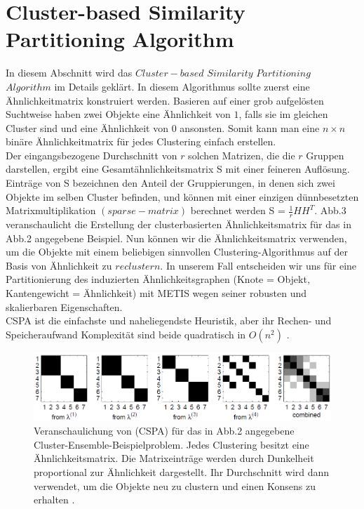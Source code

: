 \documentclass[runningheads]{llncs}
\begin{document}
\section{Cluster-based Similarity Partitioning Algorithm}
In diesem Abschnitt wird das $Cluster-based$ $Similarity$ $Partitioning$ $Algorithm$ im Details geklärt. In diesem Algorithmus sollte zuerst eine Ähnlichkeitmatrix konstruiert werden. Basieren auf einer grob aufgelösten Suchtweise haben zwei Objekte eine Ähnlichkeit von $1$, falls sie im gleichen Cluster sind und eine Ähnlichkeit von $0$ ansonsten. Somit kann man eine $n \times n$ binäre Ähnlichkeitmatrix für jedes Clustering einfach erstellen. \\
Der eingangsbezogene Durchschnitt von $r$ solchen Matrizen, die die $r$ Gruppen darstellen, ergibt eine Gesamtähnlichkeitsmatrix S mit einer feineren Auflösung. Einträge von S bezeichnen den Anteil der Gruppierungen, in denen sich zwei Objekte im selben Cluster befinden,
und können mit einer einzigen dünnbesetzten Matrixmultiplikation $(sparse- matrix)$ berechnet werden S = $\frac{1}{r} H H^{T}$. Abb.3 veranschaulicht die Erstellung der clusterbasierten Ähnlichkeitsmatrix für das in Abb.2 angegebene Beispiel. Nun können wir die Ähnlichkeitsmatrix verwenden, um die Objekte mit einem beliebigen sinnvollen
Clustering-Algorithmus auf der Basis von Ähnlichkeit zu $reclustern$. In unserem Fall entscheiden wir uns für eine Partitionierung des induzierten Ähnlichkeitsgraphen (Knote = Objekt, Kantengewicht = Ähnlichkeit) mit METIS 
wegen seiner robusten und skalierbaren Eigenschaften.\\
CSPA ist die einfachste und naheliegendste Heuristik, aber ihr Rechen- und Speicheraufwand
Komplexität sind beide quadratisch in $O(n^2)$ \cite{strehl2002cluster}.
\begin{figure}[t]
	\begin{center}
		\includegraphics[width=\textwidth]{Abbildung2}
		\caption{Veranschaulichung von (CSPA) für das in Abb.2 angegebene Cluster-Ensemble-Beispielproblem. Jedes Clustering besitzt eine
			Ähnlichkeitsmatrix. Die Matrixeinträge werden durch Dunkelheit proportional zur Ähnlichkeit dargestellt.
			Ihr Durchschnitt wird dann verwendet, um die Objekte neu zu clustern und einen Konsens zu erhalten \cite{strehl2002cluster}.}
	\end{center}
\end{figure}
\end{document}
